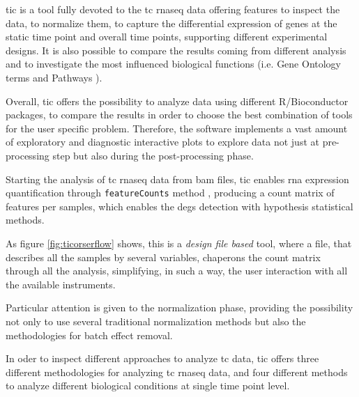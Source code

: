 \Gls{tic} is a tool fully devoted to the \gls{tc} \gls{rnaseq} data offering features to inspect the data, to normalize them, to capture the differential expression of genes at the static time point and overall time points, supporting different experimental designs.
It is also possible to compare the results coming from different analysis and to investigate the most influenced biological functions (i.e. Gene Ontology terms and Pathways \cite{GeneOntologyConsortium2004, GeneOntologyConsortium2015} ).

Overall, \gls{tic} offers the possibility to analyze data using different R/Bioconductor \cite{Gentleman2004} packages, to compare the results in order to choose the best combination of tools for the user specific problem. Therefore, the software implements a vast amount of exploratory and diagnostic interactive plots to explore data not just at pre-processing step but also during the post-processing phase. 



Starting the analysis of \gls{tc} \gls{rnaseq} data from \gls{bam} files, \gls{tic} enables \gls{rna} expression quantification through \lstinline!featureCounts! method \cite{Liao2014}, producing a count matrix of features per samples, which enables the \glspl{deg} detection with hypothesis statistical methods.

As figure \ref{fig:ticorserflow} shows, this is a \textit{design file based} tool, where a file, that describes all the samples by several variables, chaperons the count matrix through all the analysis, simplifying, in such a way, the user interaction with all the available instruments.
 
Particular attention is given to the normalization phase, providing the possibility not only to use several traditional normalization methods but also the methodologies for batch effect removal.

In oder to inspect different approaches to analyze \gls{tc} data, \gls{tic} offers three different methodologies for analyzing \gls{tc} \gls{rnaseq} data, and four different methods to analyze different biological conditions at single time point level.


